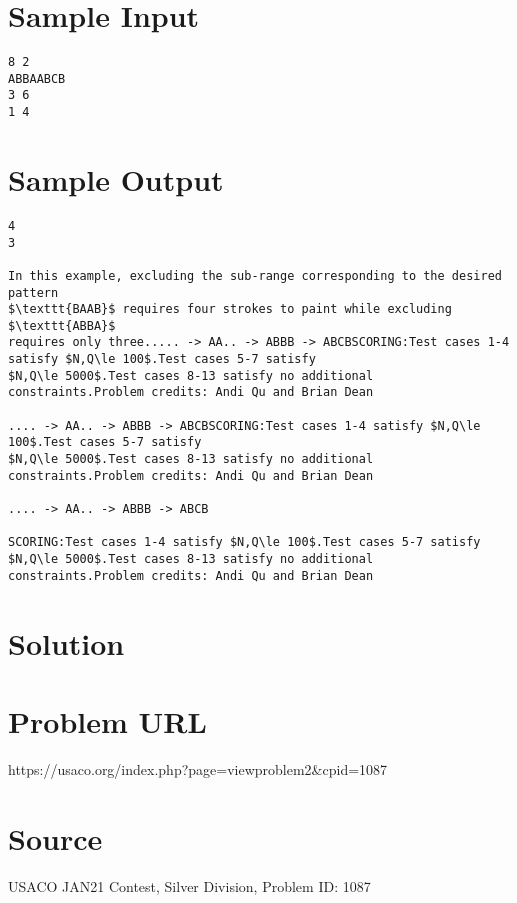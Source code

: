 \documentclass[12pt]{article}
\begin{document}
\section*{Sample Input}
\begin{verbatim}
8 2
ABBAABCB
3 6
1 4
\end{verbatim}

\section*{Sample Output}
\begin{verbatim}
4
3

In this example, excluding the sub-range corresponding to the desired pattern
$\texttt{BAAB}$ requires four strokes to paint while excluding $\texttt{ABBA}$ 
requires only three..... -> AA.. -> ABBB -> ABCBSCORING:Test cases 1-4 satisfy $N,Q\le 100$.Test cases 5-7 satisfy
$N,Q\le 5000$.Test cases 8-13 satisfy no additional constraints.Problem credits: Andi Qu and Brian Dean

.... -> AA.. -> ABBB -> ABCBSCORING:Test cases 1-4 satisfy $N,Q\le 100$.Test cases 5-7 satisfy
$N,Q\le 5000$.Test cases 8-13 satisfy no additional constraints.Problem credits: Andi Qu and Brian Dean

.... -> AA.. -> ABBB -> ABCB

SCORING:Test cases 1-4 satisfy $N,Q\le 100$.Test cases 5-7 satisfy
$N,Q\le 5000$.Test cases 8-13 satisfy no additional constraints.Problem credits: Andi Qu and Brian Dean
\end{verbatim}

\section*{Solution}


\section*{Problem URL}
https://usaco.org/index.php?page=viewproblem2&cpid=1087

\section*{Source}
USACO JAN21 Contest, Silver Division, Problem ID: 1087
\end{document}
